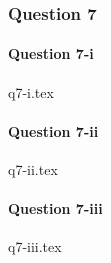 \documentclass[crop=false,fleqn]{standalone}
\begin{document}
    \subsubsection{Question 7}
    
    \paragraph{Question 7-i}
    {q7-i.tex}

    \paragraph{Question 7-ii}
    {q7-ii.tex}

    \paragraph{Question 7-iii}
    {q7-iii.tex}
\end{document}
